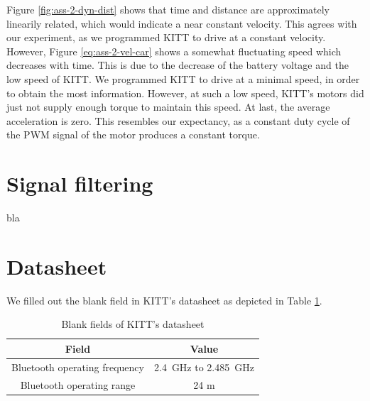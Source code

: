 \documentclass[11pt,titlepage]{report}
\begin{document}
Figure \ref{fig:ass-2-dyn-dist} shows that time and distance are approximately linearily related, which would indicate a near constant velocity. This agrees with our experiment, as we programmed KITT to drive at a constant velocity. However, Figure \ref{eq:ass-2-vel-car} shows a somewhat fluctuating speed which decreases with time. This is due to the decrease of the battery voltage and the low speed of KITT. We programmed KITT to drive at a minimal speed, in order to obtain the most information. However, at such a low speed, KITT's motors did just not supply enough torque to maintain this speed. At last, the average acceleration is zero. This resembles our expectancy, as a constant duty cycle of the PWM signal of the motor produces a constant torque.

\section{Signal filtering}
bla

\section{Datasheet}
We filled out the blank field in KITT's datasheet as depicted in Table \ref{tab:ass2-datasheet}.

\begin{table}[H]
	\centering
	\caption{Blank fields of KITT's datasheet}
	\label{tab:ass2-datasheet}
	\begin{tabular}{c c}
		\hline\hline
		Field & Value \\
		\hline
		Bluetooth operating frequency & \SI{2.4}{GHz} to \SI{2.485}{GHz} \\
		Bluetooth operating range & 24 m
		\hline
		\end{tabular}
\end{table}
\end{document}
